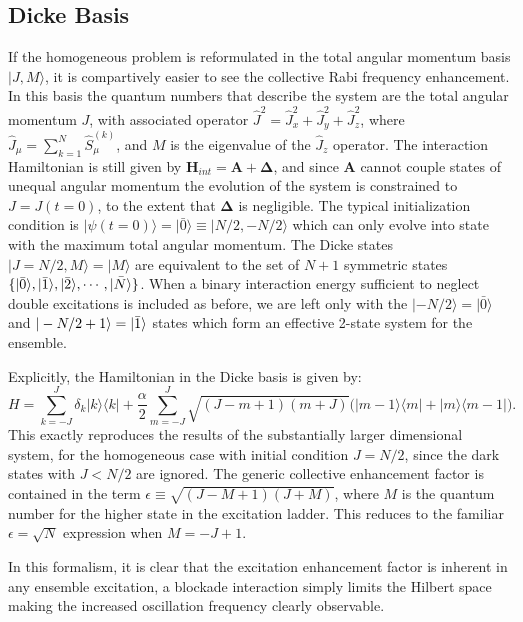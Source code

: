 \subsection{Dicke Basis}\label{sec_jm}
If the homogeneous problem is reformulated in the total angular momentum basis $|J,M\rangle$, it is compartively easier to see the collective Rabi frequency enhancement.
In this basis the quantum numbers that describe the system are the total angular momentum $J$, with associated operator $\hat{J}^2=\hat{J}_x^2+\hat{J}_y^2+\hat{J}_z^2$, where $\hat{J}_{\mu}=\sum_{k=1}^N \hat{S}_{\mu}^{(k)}$, and $M$ is the eigenvalue of the $\hat{J}_z$ operator.
The interaction Hamiltonian is still given by $\mathbf{H}_{int} = \mathbf{A} + \mathbf{\Delta}$, and since $\mathbf{A}$ cannot couple states of unequal angular momentum the evolution of the system is constrained to $J=J(t=0)$, to the extent that $\mathbf{\Delta}$ is negligible.
The typical initialization condition is $|\psi(t=0)\rangle = |\bar{0}\rangle \equiv |N/2,-N/2\rangle$ which can only evolve into state with the maximum total angular momentum.
The Dicke states $|J=N/2,M\rangle=|M\rangle$ are equivalent to the set of $N+1$ symmetric states $\{|\bar{0}\rangle, |\bar{1}\rangle{}, |\bar{2}\rangle, \cdots, |\bar{N}\rangle\}$.
When a binary interaction energy sufficient to neglect double excitations is included as before, we are left only with the $|-N/2\rangle = |\bar{0}\rangle$ and $|-N/2+1\rangle = |\bar{1}\rangle{}$ states which form an effective 2-state system for the ensemble.

Explicitly, the Hamiltonian in the Dicke basis is given by:
\begin{equation}
  H = \sum_{k=-J}^{J}\delta_k|k\rangle\langle k| 
  + \frac{\alpha}{2}\sum_{m=-J}^{J} \sqrt{\left(J-m+1\right)\left(m+J\right)}\bigg(|m-1\rangle\langle m| + |m\rangle\langle m-1|\bigg).
\end{equation}
This exactly reproduces the results of the substantially larger dimensional system, for the homogeneous case with initial condition $J=N/2$, since the dark states with $J<N/2$ are ignored.
The generic collective enhancement factor is contained in the term $\epsilon \equiv \sqrt{(J-M+1)(J+M)}$, where $M$ is the quantum number for the higher state in the excitation ladder.
This reduces to the familiar $\epsilon = \sqrt{N}$ expression when $M=-J+1$.

In this formalism, it is clear that the excitation enhancement factor is inherent in any ensemble excitation, a blockade interaction simply limits the Hilbert space making the increased oscillation frequency clearly observable.
